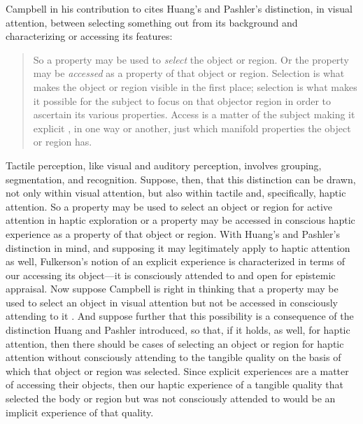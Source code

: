 Campbell in his contribution to \citet[54]{Campbell:2014aa} cites Huang's and Pashler's \citeyearpar{Huang:2007jk} distinction, in visual attention, between selecting something out from its background and characterizing or accessing its features: 
\begin{quote}
	So a property may be used to \emph{select} the object or region. Or the property may be \emph{accessed} as a property of that object or region. Selection is what makes the object or region visible in the first place; selection is what makes it possible for the subject to focus on that objector region in order to ascertain its various properties. Access is a matter of the subject making it explicit , in one way or another, just which manifold properties the object or region has.
\end{quote}
Tactile perception, like visual and auditory perception, involves grouping, segmentation, and recognition. Suppose, then, that this distinction can be drawn, not only within visual attention, but also within tactile and, specifically, haptic attention. So a property may be used to select an object or region for active attention in haptic exploration or a property may be accessed in conscious haptic experience as a property of that object or region. With Huang's and Pashler's distinction in mind, and supposing it may legitimately apply to haptic attention as well, Fulkerson's notion of an explicit experience is characterized in terms of our accessing its object---it is  consciously attended to and open for epistemic appraisal. Now suppose Campbell is right in thinking that a property may be used to select an object in visual attention but not be accessed in consciously attending to it \citep[chapter 3.2]{Campbell:2014aa}. And suppose further that this possibility is a consequence of the distinction Huang and Pashler introduced, so that, if it holds, as well, for haptic attention, then there should be cases of selecting an object or region for haptic attention without consciously attending to the tangible quality on the basis of which that object or region was selected. Since explicit experiences are a matter of accessing their objects, then our haptic experience of a tangible quality that selected the body or region but was not consciously attended to would be an implicit experience of that quality.

